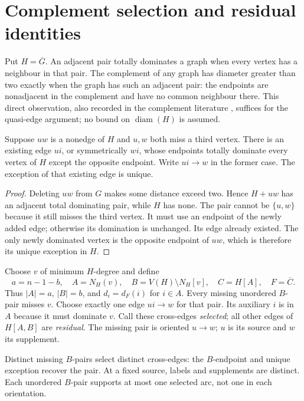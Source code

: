 \documentclass[11pt,a4paper]{article}
\DeclareMathOperator{\diam}{diam}
\begin{document}
\section{Complement selection and residual identities}\label{sec:setup}
Put $H=\overline G$. An adjacent pair totally dominates a graph when every vertex has a neighbour in that pair. The complement of any graph has diameter greater than two exactly when the graph has such an adjacent pair: the endpoints are nonadjacent in the complement and have no common neighbour there. This direct observation, also recorded in the complement literature \cite{wang,haynes}, suffices for the quasi-edge argument; no bound on $\diam(H)$ is assumed.
\begin{lemma}\label{lem:quasi}
Suppose $uw$ is a nonedge of $H$ and $u,w$ both miss a third vertex. There is an existing edge $ui$, or symmetrically $wi$, whose endpoints totally dominate every vertex of $H$ except the opposite endpoint. Write $ui\to w$ in the former case. The exception of that existing edge is unique.
\end{lemma}
\begin{proof}
Deleting $uw$ from $G$ makes some distance exceed two. Hence $H+uw$ has an adjacent total dominating pair, while $H$ has none. The pair cannot be $\{u,w\}$ because it still misses the third vertex. It must use an endpoint of the newly added edge; otherwise its domination is unchanged. Its edge already existed. The only newly dominated vertex is the opposite endpoint of $uw$, which is therefore its unique exception in $H$.
\end{proof}
Choose $v$ of minimum $H$-degree and define
\[
 a=n-1-b,\quad A=N_H(v),\quad B=V(H)\setminus N_H[v],\quad
 C=H[A],\quad F=\overline C.
\]
Thus $|A|=a$, $|B|=b$, and $d_i=d_F(i)$ for $i\in A$. Every missing unordered $B$-pair misses $v$. Choose exactly one edge $ui\to w$ for that pair. Its auxiliary $i$ is in $A$ because it must dominate $v$. Call these cross-edges \emph{selected}; all other edges of $H[A,B]$ are \emph{residual}. The missing pair is oriented $u\to w$; $u$ is its source and $w$ its supplement.

Distinct missing $B$-pairs select distinct cross-edges: the $B$-endpoint and unique exception recover the pair. At a fixed source, labels and supplements are distinct. Each unordered $B$-pair supports at most one selected arc, not one in each orientation.
\end{document}
